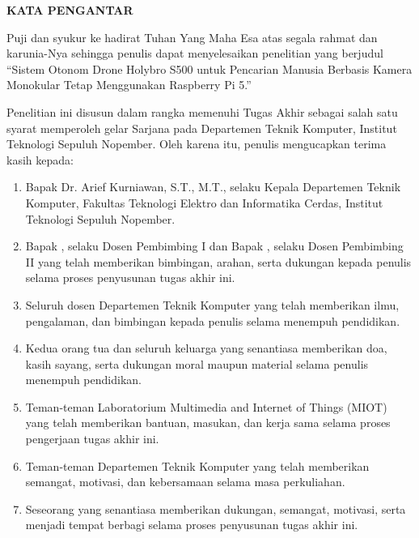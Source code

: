 \begin{center}
	\Large
	\textbf{KATA PENGANTAR}
\end{center}


\vspace{2ex}


Puji dan syukur ke hadirat Tuhan Yang Maha Esa atas segala rahmat dan karunia-Nya sehingga penulis dapat menyelesaikan penelitian yang berjudul ``Sistem Otonom Drone Holybro S500 untuk Pencarian Manusia Berbasis Kamera Monokular Tetap Menggunakan Raspberry Pi 5.''

Penelitian ini disusun dalam rangka memenuhi Tugas Akhir sebagai salah satu syarat memperoleh gelar Sarjana pada Departemen Teknik Komputer, Institut Teknologi Sepuluh Nopember. Oleh karena itu, penulis mengucapkan terima kasih kepada:

\begin{enumerate}[nolistsep]
	\item Bapak Dr. Arief Kurniawan, S.T., M.T., selaku Kepala Departemen Teknik Komputer, Fakultas Teknologi Elektro dan Informatika Cerdas, Institut Teknologi Sepuluh Nopember.
	\item Bapak \advisor, selaku Dosen Pembimbing I dan Bapak \coadvisor, selaku Dosen Pembimbing II yang telah memberikan bimbingan, arahan, serta dukungan kepada penulis selama proses penyusunan tugas akhir ini.
	\item Seluruh dosen Departemen Teknik Komputer yang telah memberikan ilmu, pengalaman, dan bimbingan kepada penulis selama menempuh pendidikan.
	\item Kedua orang tua dan seluruh keluarga yang senantiasa memberikan doa, kasih sayang, serta dukungan moral maupun material selama penulis menempuh pendidikan.
	\item Teman-teman Laboratorium Multimedia and Internet of Things (MIOT) yang telah memberikan bantuan, masukan, dan kerja sama selama proses pengerjaan tugas akhir ini.
	\item Teman-teman Departemen Teknik Komputer yang telah memberikan semangat, motivasi, dan kebersamaan selama masa perkuliahan.
	\item Seseorang yang senantiasa memberikan dukungan, semangat, motivasi, serta menjadi tempat berbagi selama proses penyusunan tugas akhir ini.
\end{enumerate}

